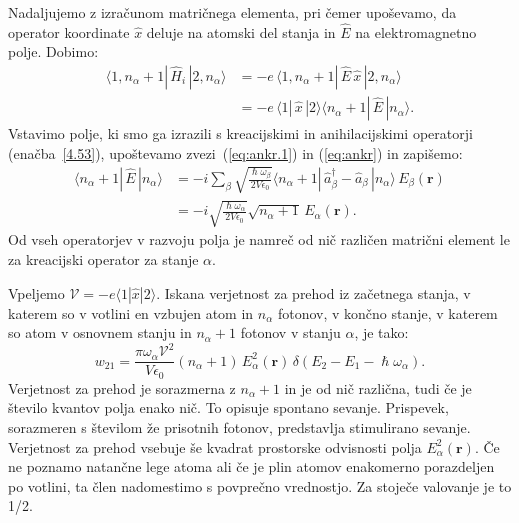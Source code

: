 Nadaljujemo z izračunom matričnega elementa, pri čemer upoševamo, da operator koordinate
$\hat{x}$ deluje na atomski del stanja in $\hat{E}$ na elektromagnetno
polje. Dobimo:
\begin{align}
\langle1,n_{\alpha}+1|\,\hat{H}_{i}\,|2,n_{\alpha}\rangle & =  -e\,
\langle1,n_{\alpha}+1|\,\hat{E}\,\hat{x}\,|2,n_{\alpha}\rangle \\
 & =  -e\,\langle1|\,\hat{x}\,|2\rangle\langle n_{\alpha}+1|\,\hat{E}\,|n_{\alpha}\rangle.
\end{align}
Vstavimo polje, ki smo ga izrazili s kreacijskimi in anihilacijskimi operatorji (enačba~\ref{4.53}),
upoštevamo zvezi~(\ref{eq:ankr.1}) in (\ref{eq:ankr}) in zapišemo:
\begin{align}
\langle n_{\alpha}+1|\, \hat{E}\,|n_{\alpha}\rangle & = 
 -i\sum_{\beta}\sqrt{\frac{\hslash\omega_{\beta}}{2V\epsilon_{0}}}
\langle n_{\alpha}+1|\,\hat{a}_{\beta}^{\dagger}-\hat{a}_{\beta}\,|n_{\alpha}\rangle\, 
E_{\beta}(\mathbf{r})\nonumber \\
 & =  -i\sqrt{\frac{\hslash\omega_{\alpha}}{2V\epsilon_{0}}}
 \sqrt{n_{\alpha}+1}\, E_{\alpha}(\mathbf{r}).
\end{align}
Od vseh operatorjev v razvoju polja je namreč od nič različen matrični
element le za kreacijski operator za stanje $\alpha$.

Vpeljemo $\mathcal{V} = -e \langle1|\hat{x}|2\rangle$.
 Iskana verjetnost za prehod iz 
začetnega stanja, v katerem so v votlini en vzbujen atom in $n_{\alpha}$ fotonov, v končno
stanje, v katerem so atom v osnovnem stanju in $n_{\alpha}+1$ fotonov v stanju $\alpha$, je tako:
\begin{equation}
w_{21}=\frac{\pi \omega_{\alpha}\mathcal{V}^{2}}{V\epsilon_{0}}
(n_{\alpha}+1)\,E_{\alpha}^{2}(\mathbf{r})\,\delta(E_{2}-E_{1}-\hslash\omega_{\alpha}).
\label{4.56}
\end{equation}
Verjetnost za prehod je sorazmerna z $n_{\alpha}+1$ in je od nič
različna, tudi če je število kvantov polja enako nič. To opisuje 
spontano sevanje. Prispevek, sorazmeren 
s številom že prisotnih fotonov, predstavlja stimulirano 
sevanje. Verjetnost za prehod vsebuje
še kvadrat prostorske odvisnosti polja $E_{\alpha}^{2}(\mathbf{r})$.
Če ne poznamo natančne lege atoma ali če je plin atomov enakomerno
porazdeljen po votlini, ta člen nadomestimo s povprečno vrednostjo.
Za stoječe valovanje je to 1/2.

